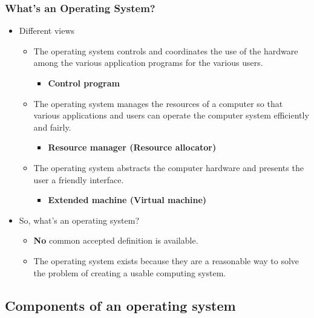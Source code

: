 \documentclass[CJKutf8,xcolor=pdftex,dvipsnames,table]{beamer}
\begin{document}
\begin{CJK*}{UTF8}{song}
  \begin{frame}
    \frametitle{What's an Operating System?} \pause
	  \begin{itemize}
	  \item{Different views} \pause
	    \begin{itemize}
	    \item{The operating system controls and coordinates the use of the hardware among the various application programs for the various users.} \pause
	      \begin{itemize}
	      \item{\textbf{Control program}} \pause
	      \end{itemize}
	    \item{The operating system manages the resources of a computer so that various applications and users can operate the computer system efficiently and fairly.} \pause
	      \begin{itemize}
	      \item{\textbf{Resource manager (Resource allocator)}} \pause
	      \end{itemize}
	    \item{The operating system abstracts the computer hardware and presents the user a friendly interface.} \pause
	      \begin{itemize}
	      \item{\textbf{Extended machine (Virtual machine)}} \pause
	      \end{itemize}
	    \end{itemize}
	  \item{So, what's an operating system?} \pause
	    \begin{itemize}
	    \item{\textbf{No} common accepted definition is available.} \pause
	    \item{The operating system exists because they are a reasonable way to solve the problem of creating a usable computing system.}
	    \end{itemize}
	  \end{itemize}
  \end{frame}

  \subsection{Components of an operating system}


\end{CJK*}
\end{document}
